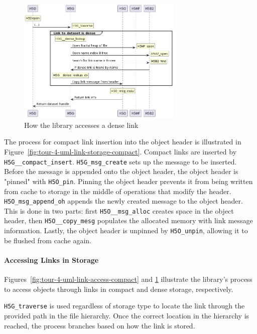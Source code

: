 \begin{figure}
\centering
\includegraphics[width=0.70\textwidth]{images/tour_4_uml_link_access_dense.png}
\caption{How the library accesses a dense link}
\label{fig:tour-4-uml-link-access-dense}
\end{figure}

The process for compact link insertion into the object header is illustrated in Figure~\ref{fig:tour-4-uml-link-storage-compact}. Compact links are inserted by \texttt{H5G\_\_compact\_insert}. \texttt{H5G\_msg\_create} sets up the message to be inserted. Before the message is appended onto the object header, the object header is "pinned" with \texttt{H5O\_pin}. Pinning the object header prevents it from being written from cache to storage in the middle of operations that modify the header. \texttt{H5O\_msg\_append\_oh} appends the newly created message to the object header. This is done in two parts: first \texttt{H5O\_\_msg\_alloc} creates space in the object header, then \texttt{H5O\_\_copy\_mesg} populates the allocated memory with link message information. Lastly, the object header is unpinned by \texttt{H5O\_unpin}, allowing it to be flushed from cache again.

\paragraph{Accessing Links in Storage} Figures~\ref{fig:tour-4-uml-link-access-compact} and \ref{fig:tour-4-uml-link-access-dense} illustrate the library's process to access objects through links in compact and dense storage, respectively.

\texttt{H5G\_traverse} is used regardless of storage type to locate the link through the provided path in the file hierarchy. Once the correct location in the hierarchy is reached, the process branches based on how the link is stored.

